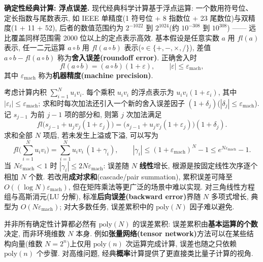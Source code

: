 \documentclass[utf8]{article} %
\numberwithin{equation}{section}   %
\newtheorem{Note}{\hskip 2em {\color{red} 注}}[subsection]
\newtheorem{Eg}{\hskip 2em {\color{black} 例}}[subsection]
\begin{document}
\textbf{确定性经典计算: 浮点误差.} 现代经典科学计算基于浮点运算: 一个数用符号位、
定长指数与尾数表示, 如 IEEE 单精度(1 符号位 + 8 指数位 + 23 尾数位)与双精度(1 + 11 + 52),
后者的数值范围约为 $2^{-1022}$ 到 $2^{1024}$(约 $10^{-308}$ 到 $10^{308}$) ——
远比覆盖同样范围需 2000 位以上的定点表示高效. 基本假设是任意实数 $a$ 用 $fl(a)$ 表示,
任一二元运算 $a \circ b$ 用 $fl(a \circ b)$ 表示($\circ \in \{+, -, \times, /\}$), 差值
$a \circ b - fl(a \circ b)$ 称为\textbf{舍入误差(roundoff error)}. 正确舍入时
\begin{equation}
    fl(a \circ b) = (a \circ b)(1 + \varepsilon), \qquad |\varepsilon| \le \varepsilon_{\mathrm{mach}},
\end{equation}
其中 $\varepsilon_{\mathrm{mach}}$ 称为\textbf{机器精度(machine precision)}.

\begin{Eg}[内积: 误差线性累积的典型例子]
    考虑计算内积 $\sum_{i=1}^N u_i v_i$. 每个乘积 $u_i v_i$ 的浮点表示为 $u_i v_i(1 + \varepsilon_i)$,
    其中 $|\varepsilon_i| \le \varepsilon_{\mathrm{mach}}$; 求和时每次加法还引入一个新的舍入误差因子
    $(1 + \delta_j)$($|\delta_j| \le \varepsilon_{\mathrm{mach}}$). 记 $s_{j-1}$ 为前 $j-1$ 项的部分和,
    则第 $j$ 次加法满足
    \[
        fl\big(s_{j-1} + u_j v_j(1+\varepsilon_j)\big) = \big(s_{j-1} + u_j v_j(1+\varepsilon_j)\big)(1 + \delta_j).
    \]
    求和全部 $N$ 项后, 若未发生上溢或下溢, 可以写为
    \[
        fl\Big(\sum_{i=1}^N u_i v_i\Big) = \sum_{i=1}^N u_i v_i\, (1 + \gamma_i),
        \qquad |\gamma_i| \le (1 + \varepsilon_{\mathrm{mach}})^N - 1 \le e^{N\varepsilon_{\mathrm{mach}}} - 1.
    \]
    当 $N\varepsilon_{\mathrm{mach}} < 1$ 时 $|\gamma_i| \le 2N\varepsilon_{\mathrm{mach}}$: 误差随 $N$
    \textbf{线性}增长, 根源是按固定线性次序逐个相加 $N$ 个数.
    若改用\textbf{成对求和}(cascade/pair summation), 累积误差可降至 $O((\log N)\varepsilon_{\mathrm{mach}})$,
    但在矩阵乘法等更广泛的场景中难以实现. 对三角线性方程组与高斯消元(LU 分解),
    标准\textbf{后向误差(backward error)}界随 $N$ 多项式增长, 典型为 $O(N\varepsilon_{\mathrm{mach}})$; 对大多数任务,
    误差累积中的 $\mathrm{poly}(N)$ 因子难以避免.
\end{Eg}

\begin{Note}[误差由运算次数而非环境维数决定]
    并非所有确定性计算都必然有 $\mathrm{poly}(N)$ 的误差累积: 误差累积由\textbf{基本运算的个数}决定,
    而非环境维数 $N$ 本身. 例如\textbf{张量网络(tensor network)}方法可以在某些结构向量(维数 $N = 2^n$)上仅用
    $\mathrm{poly}(n)$ 次运算完成计算, 误差也随之只依赖 $\mathrm{poly}(n)$ 个步骤.
    对高维问题, 经典\textbf{概率}计算提供了更直接类比量子计算的视角.
\end{Note}
\end{document}
